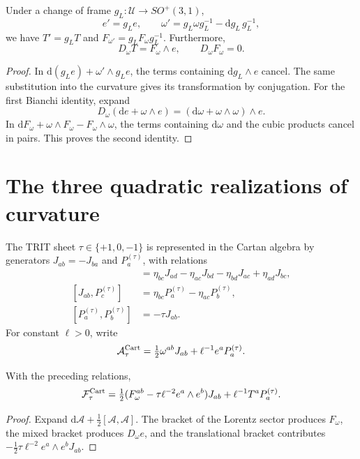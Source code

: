 \begin{proposition}
\label{x_reciprocidad:vii:prop:bianchi-cartan}
Under a change of frame \(g_L:\mathcal U\to SO^+(3,1)\),
\[
 e'=g_Le,\qquad
 \omega'=g_L\omega g_L^{-1}-\mathrm dg_L\,g_L^{-1},
\]
we have \(T'=g_LT\) and \(F_{\omega'}=g_LF_\omega g_L^{-1}\).
Furthermore,
\begin{equation}
 D_\omega T=F_\omega\wedge e,\qquad D_\omega F_\omega=0.
 \label{x_reciprocidad:vii:eq:bianchi-realizacion}
\end{equation}
\end{proposition}
\begin{proof}
In \(\mathrm d(g_Le)+\omega'\wedge g_Le\), the terms
containing \(\mathrm dg_L\wedge e\) cancel.
The same substitution into the curvature gives its transformation by
conjugation. For the first Bianchi identity, expand
\[
 D_\omega(\mathrm de+\omega\wedge e)
 =(\mathrm d\omega+\omega\wedge\omega)\wedge e.
\]
In \(\mathrm dF_\omega+\omega\wedge F_\omega-F_\omega\wedge\omega\),
the terms containing \(\mathrm d\omega\) and the cubic
products cancel in pairs. This proves the second identity.
\end{proof}

\section{The three quadratic realizations of curvature}

The TRIT sheet \(\tau\in\{+1,0,-1\}\) is represented in
the Cartan algebra by generators \(J_{ab}=-J_{ba}\)
and \(P_a^{(\tau)}\), with relations
\begin{align*}
 [J_{ab},J_{cd}]&=
 \eta_{bc}J_{ad}-\eta_{ac}J_{bd}
 -\eta_{bd}J_{ac}+\eta_{ad}J_{bc},\\
 [J_{ab},P_c^{(\tau)}]&=
 \eta_{bc}P_a^{(\tau)}-\eta_{ac}P_b^{(\tau)},\\
 [P_a^{(\tau)},P_b^{(\tau)}]&=-\tau J_{ab}.
\end{align*}
For constant \(\ell>0\), write
\[
 \mathcal A_\tau^{\rm Cart}
 =\tfrac12\omega^{ab}J_{ab}+\ell^{-1}e^aP_a^{(\tau)}.
\]

\begin{proposition}
\label{x_reciprocidad:vii:prop:curvatura-tritificada}
With the preceding relations,
\begin{equation}
 \mathcal F_\tau^{\rm Cart}
 =\tfrac12(F_\omega^{ab}-\tau\ell^{-2}e^a\wedge e^b)J_{ab}
     +\ell^{-1}T^aP_a^{(\tau)}.
 \label{x_reciprocidad:vii:eq:curvatura-tritificada}
\end{equation}
\end{proposition}
\begin{proof}
Expand \(\mathrm d\mathcal A+\tfrac12[\mathcal A,\mathcal A]\).
The bracket of the Lorentz sector produces \(F_\omega\), the
mixed bracket produces \(D_\omega e\), and the translational
bracket contributes
\(-\tfrac12\tau\ell^{-2}e^a\wedge e^bJ_{ab}\).
\end{proof}

